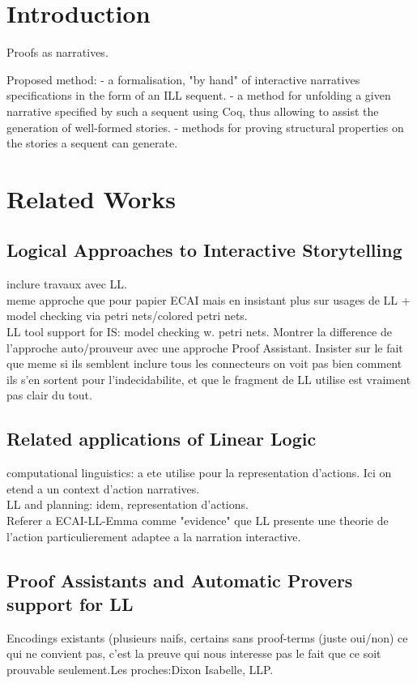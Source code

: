 \documentclass[runningheads,a4paper]{llncs}
\begin{document}
\section{Introduction}
Proofs as narratives.

Proposed method:
- a formalisation, "by hand" of interactive narratives specifications in the form of an ILL sequent.
- a method for unfolding a given narrative specified by such a sequent using Coq, thus allowing to assist the generation of well-formed stories.
- methods for proving structural properties on the stories a sequent can generate.

\section{Related Works}
\subsection{Logical Approaches to Interactive Storytelling}
inclure travaux avec LL.\\
meme approche que pour papier ECAI mais en insistant plus sur usages de LL + model checking via petri nets/colored petri nets.\\
LL tool support for IS: model checking w. petri nets. Montrer la difference de l'approche auto/prouveur avec une approche Proof Assistant. Insister sur le fait que meme si ils semblent inclure tous les connecteurs on voit pas bien comment ils s'en sortent pour l'indecidabilite, et que le fragment de LL utilise est vraiment pas clair du tout.
\subsection{Related applications of Linear Logic}
computational linguistics: a ete utilise pour la representation d'actions. Ici on etend a un context d'action narratives.\\
LL and planning: idem, representation d'actions.\\
Referer a ECAI-LL-Emma comme "evidence" que LL presente une theorie de l'action particulierement adaptee a la narration interactive.
\subsection{Proof Assistants and Automatic Provers support for LL}
Encodings existants (plusieurs naifs, certains sans proof-terms (juste oui/non) ce qui ne convient pas, c'est la preuve qui nous interesse pas le fait que ce soit prouvable seulement.Les proches:Dixon Isabelle, LLP. 
\end{document}
